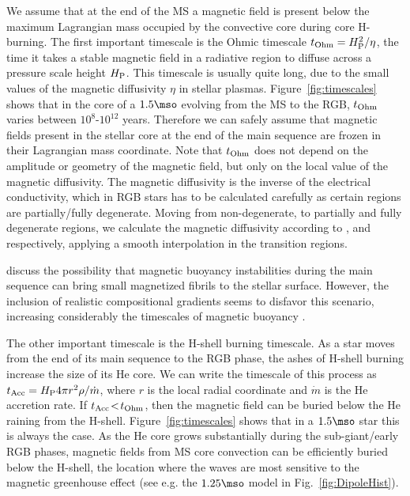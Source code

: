 We assume that at the end of the MS a magnetic field is present below the maximum Lagrangian mass occupied by the convective core during core H-burning.
The first important timescale is the Ohmic timescale $t_{\rm Ohm}= H_{\rm P}^2/\eta$, the time it takes a stable magnetic field in a radiative region to diffuse across a pressure scale height $H_{\rm P}$. This timescale is usually quite long, due to the small values of the magnetic diffusivity $\eta$ in stellar plasmas. Figure~\ref{fig:timescales} shows that in the core of a $1.5\mso$ evolving from the MS to the RGB, $t_{\rm Ohm}$ varies between $10^8$-$10^{12}$ years. Therefore we can safely assume that magnetic fields present in the stellar core at the end of the main sequence are frozen in their Lagrangian mass coordinate. Note that  $t_{\rm Ohm}$ does not depend on the amplitude or geometry of the magnetic field, but only on the local value of the magnetic diffusivity. The magnetic diffusivity is the inverse of the electrical conductivity,  which in RGB stars has to be calculated carefully as certain regions are partially/fully degenerate. Moving from non-degenerate, to partially and fully degenerate regions, we calculate the magnetic diffusivity according to \cite{1968dms..book.....S}, \cite{1987ApJ...313..284W} and \cite{1984MNRAS.209..511N} respectively, applying a smooth interpolation in the transition regions.

\citet{MacGregor_2003} discuss the possibility that magnetic buoyancy instabilities during the main sequence can bring small magnetized fibrils to the stellar surface. However, the inclusion of realistic compositional gradients seems to disfavor this scenario, increasing considerably the timescales of magnetic buoyancy \citep{MacDonald_2004}.

The other important timescale is the H-shell burning timescale. As a star moves from the end of its main sequence to the RGB phase, the ashes of H-shell burning increase the size of its He core. We can write the timescale of this process as $t_{\rm Acc} = H_{\rm P} 4\pi r^2 \rho / \dot{m}$, where $r$ is the local radial coordinate and $\dot{m}$ is the He accretion rate. If $t_{\rm Acc} \! < \! t_{\rm Ohm}$, then the magnetic field can be buried below the He raining from the H-shell. Figure~\ref{fig:timescales} shows that in a $1.5\mso$ star this is always the case. As the He core grows substantially during the sub-giant/early RGB phases, magnetic fields from MS core convection can be efficiently buried below the H-shell, the location where the waves are most sensitive to the magnetic greenhouse effect (see e.g. the $1.25\mso$ model in Fig.~\ref{fig:DipoleHist}).


